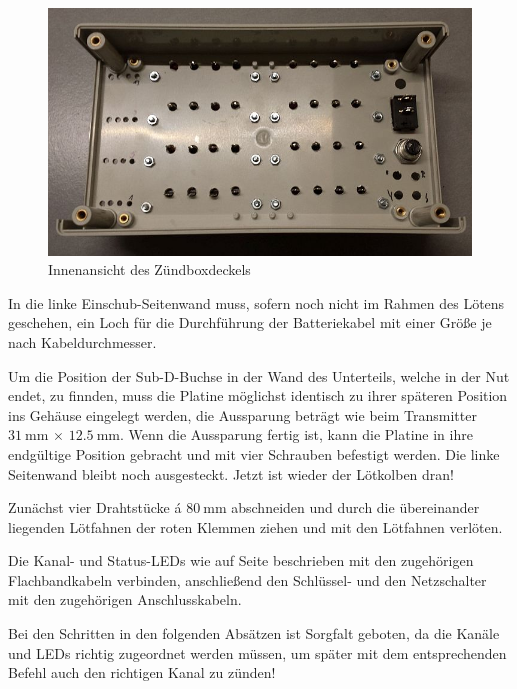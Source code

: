 \documentclass[paper=a4, parskip, numbers=noenddot, toc=listof, headsepline]{scrbook}
\begin{document}
					\begin{figure}
						\centering
						\includegraphics[width=\textwidth]{bilder/zuendboxdeckel}
						\caption{Innenansicht des Zündboxdeckels}
						\label{fig:zuendboxdeckel}
					\end{figure}

					In die linke Einschub-Seitenwand muss, sofern noch nicht im Rahmen des Lötens geschehen, ein Loch für die Durchführung der Batteriekabel mit einer Größe je nach Kabeldurchmesser.

					Um die Position der Sub-D-Buchse in der Wand des Unterteils, welche in der Nut endet, zu finnden, muss die Platine möglichst identisch zu ihrer späteren Position ins Gehäuse eingelegt werden, die Aussparung beträgt wie beim Transmitter $\SI{31}{\milli\metre}\,\times\,\SI{12,5}{\milli\metre}$. Wenn die Aussparung fertig ist, kann die Platine in ihre endgültige Position gebracht und mit vier Schrauben befestigt werden. Die linke Seitenwand bleibt noch ausgesteckt. Jetzt ist wieder der Lötkolben dran!

					Zunächst vier Drahtstücke á $\SI{80}{\milli\metre}$ abschneiden und durch die übereinander liegenden Lötfahnen der roten Klemmen ziehen und mit den Lötfahnen verlöten.

					Die Kanal- und Status-LEDs wie auf Seite \pageref{enum:leds} beschrieben mit den zugehörigen Flachbandkabeln verbinden, anschließend den Schlüssel- und den Netzschalter mit den zugehörigen Anschlusskabeln.

					Bei den Schritten in den folgenden Absätzen ist Sorgfalt geboten, da die Kanäle und LEDs richtig zugeordnet werden müssen, um später mit dem entsprechenden Befehl auch den richtigen Kanal zu zünden!
\end{document}
